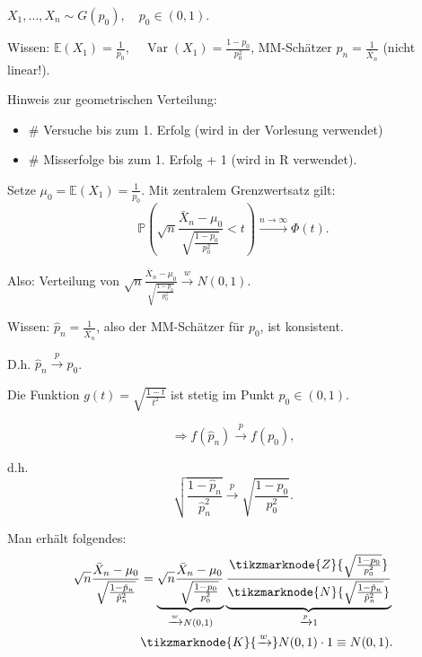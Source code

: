 \documentclass{tstextbook}
\DeclareMathOperator{\Var}{Var}
\newcommand{\E}{\mathbb E}
\newcommand{\Prob}{\mathbb P}
\begin{document}
\begin{example}
	$ X_1, \ldots, X_n \sim G(p_0), \quad p_0 \in (0,1) $. 
	
	Wissen: $ \E(X_1) = \frac{1}{p_0}, \quad \Var(X_1) = \frac{1-p_0}{p_0^2} $, MM-Schätzer $ \hat{p}_n = \frac{1}{\bar{X}_n} $ (nicht linear!).
	
	Hinweis zur geometrischen Verteilung: 
	\begin{itemize}
	\item $ \# $ Versuche bis zum 1. Erfolg (wird in der Vorlesung verwendet)
	\item $ \# $ Misserfolge bis zum 1. Erfolg + 1 (wird in R verwendet).
	\end{itemize}

	Setze $ \mu_0 = \E(X_1) = \frac{1}{p_0} $. Mit zentralem Grenzwertsatz gilt: 
	\[
	\Prob\left(\sqrt{n} \frac{\bar{X}_n - \mu_0}{\sqrt{\frac{1-p_0}{p_0^2}}} < t \right) \xrightarrow{n\to\infty} \Phi(t).
	\]
	
	Also: Verteilung von $ \sqrt{n} \frac{\bar{X}_n - \mu_0}{\sqrt{\frac{1-p_0}{p_0^2}}} \xrightarrow{w} N(0,1) $.
	
	
	
	Wissen:  $ \hat{p}_n = \frac{1}{\bar{X}_n} $, also der MM-Schätzer für $ p_0 $, ist konsistent. 
	
	D.h. $ \hat{p}_n \xrightarrow{p} p_0 $. 
	
	Die Funktion $ g(t) = \sqrt{\frac{1-t}{t^2}} $ ist stetig im Punkt $ p_0 \in (0,1) $. 
	
	\[ \Rightarrow f(\hat{p}_n) \xrightarrow{p} f(p_0), \] 
	
	d.h. \[ \sqrt{\frac{1-\hat{p}_n}{\hat{p}_n^2}} \xrightarrow{p} \sqrt{\frac{1-p_0}{p_0^2}}. \]
	
	Man erhält folgendes: 
	\[
	\begin{aligned}
		\sqrt{n}\frac{\bar{X}_n - \mu_0}{\sqrt{\frac{1-\hat{p}_n}{\hat{p}_n^2}}} & = \underbrace{\sqrt{n}\frac{\bar{X}_n - \mu_0}{\sqrt{\frac{1-p_0}{p_0^2}}}}_{\xrightarrow{w} N(0,1)} \underbrace{\frac{\tikzmarknode{Z}{\sqrt{\frac{1-p_0}{p_0^2}}}}{\tikzmarknode{N}{\sqrt{\frac{1-\hat{p}_n}{\hat{p}_n^2}}}}}_{\xrightarrow{p}1} \\
		& \tikzmarknode{K}{\xrightarrow{w}} N(0,1)\cdot 1 \equiv N(0,1).
	\end{aligned}
	\]
	

\end{example}
\end{document}
